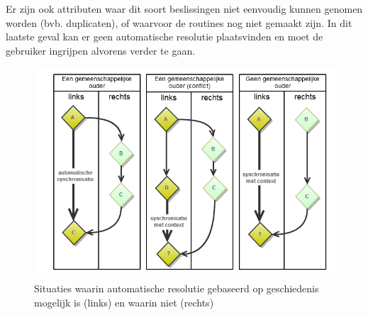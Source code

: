 Er zijn ook attributen waar dit soort beslissingen niet eenvoudig kunnen genomen worden (bvb. duplicaten), of waarvoor de routines nog niet gemaakt zijn. In dit laatste geval kan er geen automatische resolutie plaatsvinden en moet de gebruiker ingrijpen alvorens verder te gaan.

\begin{figure}[ht]
	\begin{center}
		\includegraphics[width=1.0\columnwidth]{images/3-way-merge.png}
		\caption{Situaties waarin automatische resolutie gebaseerd op geschiedenis mogelijk is (links) en waarin niet (rechts)}
		\label{fig:okay-3-way}
	\end{center}
\end{figure}